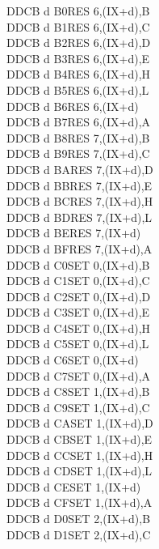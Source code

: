\begin{multicols}{3}
{\begin{tabbing}
    DDCB d B0\>RES 6,(IX+d),B\UNDOC\\
    DDCB d B1\>RES 6,(IX+d),C\UNDOC\\
    DDCB d B2\>RES 6,(IX+d),D\UNDOC\\
    DDCB d B3\>RES 6,(IX+d),E\UNDOC\\
    DDCB d B4\>RES 6,(IX+d),H\UNDOC\\
    DDCB d B5\>RES 6,(IX+d),L\UNDOC\\
    DDCB d B6\>RES 6,(IX+d)\\
    DDCB d B7\>RES 6,(IX+d),A\UNDOC\\
    DDCB d B8\>RES 7,(IX+d),B\UNDOC\\
    DDCB d B9\>RES 7,(IX+d),C\UNDOC\\
    DDCB d BA\>RES 7,(IX+d),D\UNDOC\\
    DDCB d BB\>RES 7,(IX+d),E\UNDOC\\
    DDCB d BC\>RES 7,(IX+d),H\UNDOC\\
    DDCB d BD\>RES 7,(IX+d),L\UNDOC\\
    DDCB d BE\>RES 7,(IX+d)\\
    DDCB d BF\>RES 7,(IX+d),A\UNDOC\\
    DDCB d C0\>SET 0,(IX+d),B\UNDOC\\
    DDCB d C1\>SET 0,(IX+d),C\UNDOC\\
    DDCB d C2\>SET 0,(IX+d),D\UNDOC\\
    DDCB d C3\>SET 0,(IX+d),E\UNDOC\\
    DDCB d C4\>SET 0,(IX+d),H\UNDOC\\
    DDCB d C5\>SET 0,(IX+d),L\UNDOC\\
    DDCB d C6\>SET 0,(IX+d)\\
    DDCB d C7\>SET 0,(IX+d),A\UNDOC\\
    DDCB d C8\>SET 1,(IX+d),B\UNDOC\\
    DDCB d C9\>SET 1,(IX+d),C\UNDOC\\
    DDCB d CA\>SET 1,(IX+d),D\UNDOC\\
    DDCB d CB\>SET 1,(IX+d),E\UNDOC\\
    DDCB d CC\>SET 1,(IX+d),H\UNDOC\\
    DDCB d CD\>SET 1,(IX+d),L\UNDOC\\
    DDCB d CE\>SET 1,(IX+d)\\
    DDCB d CF\>SET 1,(IX+d),A\UNDOC\\
    DDCB d D0\>SET 2,(IX+d),B\UNDOC\\
    DDCB d D1\>SET 2,(IX+d),C\UNDOC\\

\end{tabbing}}
\end{multicols}
